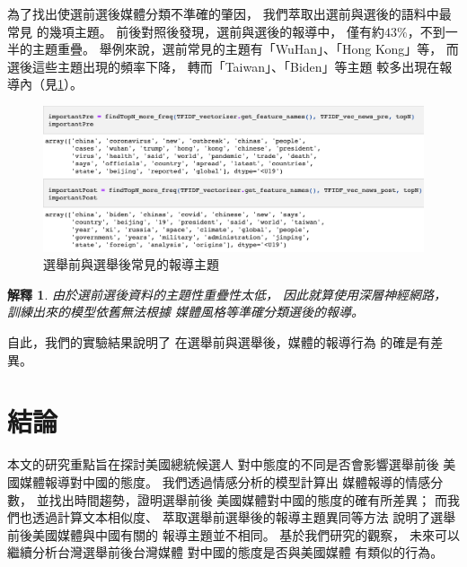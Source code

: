 \documentclass[12pt,twocolumn,letterpaper]{article}
\newtheorem{explain}{解釋}
\begin{document}
為了找出使選前選後媒體分類不準確的肇因，
我們萃取出選前與選後的語料中最常見
的幾項主題。
前後對照後發現，選前與選後的報導中，
僅有約$43\%$，不到一半的主題重疊。
舉例來說，選前常見的主題有「WuHan」、「Hong Kong」等，
而選後這些主題出現的頻率下降，
轉而「Taiwan」、「Biden」等主題
較多出現在報導內（見\cref{fig:topic}）。
\begin{figure}[h!]
    \centering
    \includegraphics[width=1.0\linewidth]{Figure/freq.png}
    \caption{選舉前與選舉後常見的報導主題}
    \label{fig:topic}
\end{figure}


\begin{explain}\label{exp:gap}
由於選前選後資料的主題性重疊性太低，
因此就算使用深層神經網路，
訓練出來的模型依舊無法根據
媒體風格等準確分類選後的報導。
\end{explain}

自此，我們的實驗結果說明了
在選舉前與選舉後，媒體的報導行為
的確是有差異。

\section{結論}\label{sec:conclu}
本文的研究重點旨在探討美國總統候選人
對中態度的不同是否會影響選舉前後
美國媒體報導對中國的態度。
我們透過情感分析的模型計算出
媒體報導的情感分數，
並找出時間趨勢，證明選舉前後
美國媒體對中國的態度的確有所差異；
而我們也透過計算文本相似度、
萃取選舉前選舉後的報導主題異同等方法
說明了選舉前後美國媒體與中國有關的
報導主題並不相同。
基於我們研究的觀察，
未來可以繼續分析台灣選舉前後台灣媒體
對中國的態度是否與美國媒體
有類似的行為。


\end{document}
